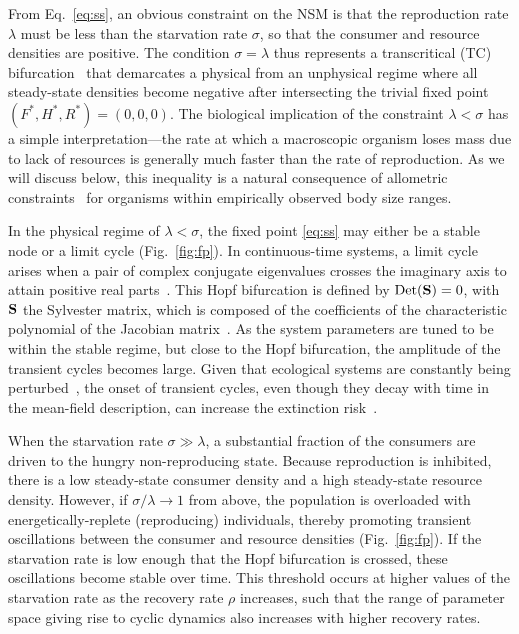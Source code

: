 \documentclass[twocolumn,preprintnumbers,amsmath,amssymb,superscriptaddress]{revtex4}
\begin{document}
\begin{bibunit}[unsrt]
From Eq.~\eqref{eq:ss}, an obvious constraint on the NSM is that the reproduction rate $\lambda$ must be less than the starvation rate $\sigma$, so that the consumer and resource densities are positive.
The condition $\sigma = \lambda$ thus represents a transcritical (TC) bifurcation~\cite{Strogatz:2008wo} that demarcates a physical from an unphysical regime where all steady-state densities become negative after intersecting the trivial fixed point $(F^*,H^*,R^*)=(0,0,0)$.
The biological implication of the constraint $\lambda<\sigma$ has a simple interpretation---the rate at which a macroscopic organism loses mass due to lack of resources is generally much faster than the rate of reproduction.
As we will discuss below, this inequality is a natural consequence of allometric constraints~\cite{Kempes:2012hy} for organisms within empirically observed body size ranges.


In the physical regime of $\lambda<\sigma$, the fixed point \eqref{eq:ss} may either be a stable node or a limit cycle (Fig.~\ref{fig:fp}).
In continuous-time systems, a limit cycle arises when a pair of complex conjugate eigenvalues crosses the imaginary axis to attain positive real parts~\cite{GuckHolmes}.
This Hopf bifurcation is defined by ${\rm Det}({\bf S}) = 0$, with $\bf S$ the Sylvester matrix, which is composed of the coefficients of the characteristic polynomial of the Jacobian matrix~\cite{Gross:2004p2428}.
As the system parameters are tuned to be within the stable regime, but close to the Hopf bifurcation, the amplitude of the transient cycles becomes large.
Given that ecological systems are constantly being perturbed~\cite{Hastings:2001jh}, the onset of transient cycles, even though they decay with time in the mean-field description, can increase the extinction risk~\cite{Neubert:1997wk,Caswell:2005eo,Neubert:2009td}.

When the starvation rate $\sigma\gg\lambda$, a substantial fraction of the consumers are driven to the hungry non-reproducing state.
Because reproduction is inhibited, there is a low steady-state consumer density and a high steady-state resource density.
However, if $\sigma/\lambda\to 1$ from above, the population is overloaded with energetically-replete (reproducing) individuals, thereby promoting transient oscillations between the consumer and resource densities (Fig.~\ref{fig:fp}).
If the starvation rate is low enough that the Hopf bifurcation is crossed, these oscillations become stable over time.
This threshold occurs at higher values of the starvation rate as the recovery rate $\rho$ increases, such that the range of parameter space giving rise to cyclic dynamics also increases with higher recovery rates.



\end{bibunit}
\end{document}

